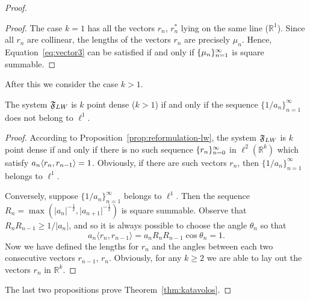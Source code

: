 \begin{proof}
\begin{proof}
      The case $k=1$ has all the vectors $r_n$, $r^*_n$ lying on the same line ($\mathbb{R}^1$).
      Since all $r_n$ are collinear, the lengths of the vectors $r_n$ are precisely $\mu_n$.
      Hence, Equation~\eqref{eq:vector3} can be satisfied if and only if $\{{\mu}_n\}_{n=1}^\infty$ is square summable.
    \end{proof}

    After this we consider the case $k > 1$.
    \begin{prop}
      The system $\mathfrak{F}_{LW}$ is $k$ point dense \textup($k > 1$\textup) if and only if the sequence $\{1/a_n\}_{n=1}^\infty$
        does not belong to $\ell^1$.
    \end{prop}
    \begin{proof}
      According to Proposition~\ref{prop:reformulation-lw}, the system $\mathfrak{F}_{LW}$ is $k$ point dense
        if and only if there is no such sequence $\{{r}_n\}_{n=0}^\infty$ in $\ell^2(\mathbb{R}^k)$ which satisfy $a_n \langle r_n, r_{n-1} \rangle = 1$.
      Obviously, if there are such vectors $r_n$, then $\{1/a_n\}_{n=1}^\infty$ belongs to $\ell^1$.

      Conversely, suppose $\{1/a_n\}_{n=1}^\infty$ belongs to $\ell^1$.
      Then the sequence $R_n = \max(\lvert a_n \rvert^{-\frac{1}{2}}, \lvert a_{n+1} \rvert^{-\frac{1}{2}})$ is square summable.
      Observe that $R_nR_{n-1} \geq 1/\lvert a_n\rvert$, and so it is always possible to choose the angle $\theta_n$ so that
      \[
        a_n \langle r_n, r_{n-1} \rangle = a_n R_n R_{n-1}\cos{\theta_n} = 1.
      \]
      Now we have defined the lengths for $r_n$ and the angles between each two consecutive vectors $r_{n-1}$, $r_n$.
      Obviously, for any $k \geq 2$ we are able to lay out the vectors $r_n$ in $\mathbb{R}^k$.
    \end{proof}
    The last two propositions prove Theorem~\ref{thm:katavolos}.
  \end{proof}
